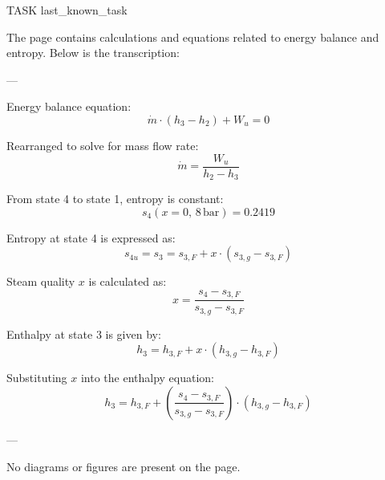 TASK {last_known_task}

The page contains calculations and equations related to energy balance and entropy. Below is the transcription:

---

Energy balance equation:
\[
\dot{m} \cdot (h_3 - h_2) + W_u = 0
\]

Rearranged to solve for mass flow rate:
\[
\dot{m} = \frac{W_u}{h_2 - h_3}
\]

From state 4 to state 1, entropy is constant:
\[
s_4 (x = 0, \, 8 \, \text{bar}) = 0.2419
\]

Entropy at state 4 is expressed as:
\[
s_{4u} = s_3 = s_{3,F} + x \cdot (s_{3,g} - s_{3,F})
\]

Steam quality \( x \) is calculated as:
\[
x = \frac{s_4 - s_{3,F}}{s_{3,g} - s_{3,F}}
\]

Enthalpy at state 3 is given by:
\[
h_3 = h_{3,F} + x \cdot (h_{3,g} - h_{3,F})
\]

Substituting \( x \) into the enthalpy equation:
\[
h_3 = h_{3,F} + \left( \frac{s_4 - s_{3,F}}{s_{3,g} - s_{3,F}} \right) \cdot (h_{3,g} - h_{3,F})
\]

---

No diagrams or figures are present on the page.